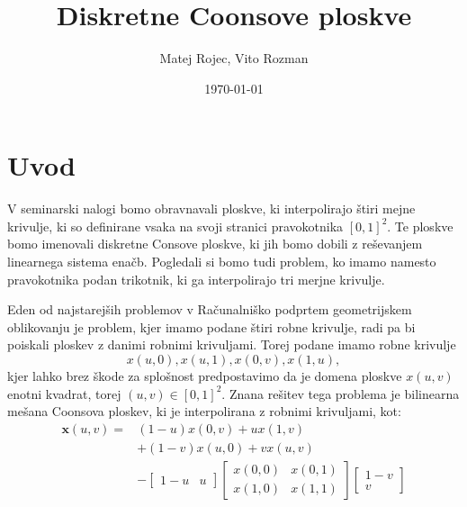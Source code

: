 \documentclass[a4paper,12pt]{article}
\begin{document}
\newcommand{\N}{\mathbb{N}}
\newcommand{\R}{\mathbb{R}}
\newcommand\sbullet[1][.5]{\mathbin{\vcenter{\hbox{\scalebox{#1}{$\bullet$}}}}}
\newtheorem{definicija}{Definicija}[section]
\newtheorem{primer}[definicija]{Primer}
\newtheorem{opomba}[definicija]{Opomba}

\title{Diskretne Coonsove ploskve}
\author{Matej Rojec, Vito Rozman}
\date{\today}

\maketitle


\newpage

\tableofcontents
\listoffigures

\newpage

\section{Uvod}

V seminarski nalogi bomo obravnavali ploskve, ki interpolirajo štiri mejne krivulje,
ki so definirane vsaka na svoji stranici pravokotnika $[0,1]^2$. 
Te ploskve bomo imenovali diskretne Consove ploskve, 
ki jih bomo dobili z reševanjem linearnega sistema enačb.
Pogledali si bomo tudi problem, ko imamo namesto pravokotnika podan 
trikotnik, ki ga interpolirajo tri merjne krivulje.


Eden od najstarejših problemov v Računalniško podprtem geometrijskem oblikovanju je problem, 
kjer imamo podane štiri robne krivulje, radi pa bi poiskali ploskev z danimi robnimi krivuljami. 
Torej podane imamo robne krivulje $$x(u,0), x(u,1), x(0,v),  x(1,u),$$ kjer lahko brez škode za 
splošnost predpostavimo da je domena ploskve $x(u,v)$ enotni kvadrat, torej $(u,v) \in [0,1]^2$. 
Znana rešitev tega problema je bilinearna mešana Coonsova ploskev, ki je interpolirana z robnimi 
krivuljami, kot: 
\begin{align*}
   \label{continiusCons}
   \mathbf{x}(u,v) =& (1-u)x(0,v) +ux(1,v)\\
    & + (1-v)x(u,0) +vx(u,v) \\
   & - 
   \begin{bmatrix} 
      1-u & u 
   \end{bmatrix}
   \begin{bmatrix} 
      x(0,0)& x(0,1)\\
      x(1,0)& x(1,1) 
   \end{bmatrix}
   \begin{bmatrix}
      1-v\\
      v
   \end{bmatrix}
\end{align*}
\end{document}
